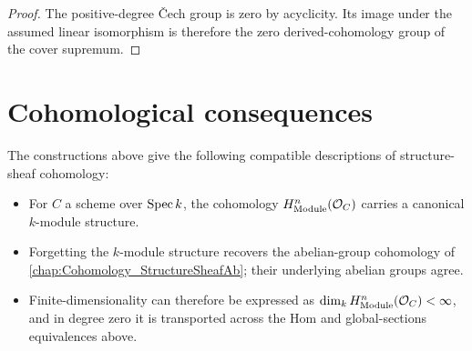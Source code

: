 \begin{proof}
  \leanok
  The positive-degree \v{C}ech group is zero by acyclicity. Its image under the assumed linear isomorphism is therefore the zero derived-cohomology group of the cover supremum.
\end{proof}

\section{Cohomological consequences}

The constructions above give the following compatible descriptions of structure-sheaf cohomology:

\begin{itemize}
  \item For \(C\) a scheme over \(\operatorname{Spec} k\), the cohomology \(H^n_{\mathrm{Module}}(\mathcal O_C)\) carries a canonical \(k\)-module structure.
  \item Forgetting the \(k\)-module structure recovers the abelian-group cohomology of \cref{chap:Cohomology_StructureSheafAb}; their underlying abelian groups agree.
  \item Finite-dimensionality can therefore be expressed as \(\dim_k H^n_{\mathrm{Module}}(\mathcal O_C)<\infty\), and in degree zero it is transported across the Hom and global-sections equivalences above.
\end{itemize}
